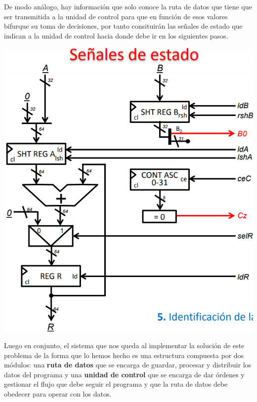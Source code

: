 \documentclass[a4paper,10pt]{book}
\begin{document}
De modo análogo, hay información que solo conoce la ruta de datos que tiene que ser transmitida a la unidad de control para que en función de esos valores bifurque su toma de decisiones, por tanto consituirán las señales de estado que indican a la unidad de control hacia donde debe ir en los siguientes pasos.
\begin{center}
\includegraphics[scale=0.6]{ruta de datos8}
\end{center}
Luego en conjunto, el sistema que nos queda al implementar la solución de este problema de la forma que lo hemos hecho es una estructura compuesta por dos módulos: una \textbf{ruta de datos} que se encarga de guardar, procesar y distribuir los datos del programa y una \textbf{unidad de control} que se encarga de dar órdenes y gestionar el flujo que debe seguir el programa y que la ruta de datos debe obedecer para operar con los datos.
\end{document}
